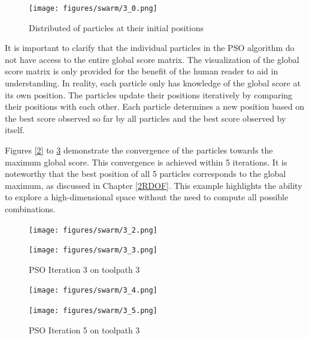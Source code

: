 \begin{figure}[H]
	\centerline{\texttt{[image: figures/swarm/3\_0.png]}}
	\caption{Distributed of particles at their initial positions}
	\label{PSO_1}
\end{figure}



It is important to clarify that the individual particles in the \acrshort{PSO} algorithm do not have access to the entire global score matrix. The visualization of the global score matrix is only provided for the benefit of the human reader to aid in understanding. In reality, each particle only has knowledge of the global score at its own position. The particles update their positions iteratively by comparing their positions with each other. Each particle determines a new position based on the best score observed so far by all particles and the best score observed by itself. 

Figures \ref{2} to \ref{5} demonstrate the convergence of the particles towards the maximum global score. This convergence is achieved within 5 iterations. It is noteworthy that the best position of all 5 particles corresponds to the global maximum, as discussed in Chapter \ref{2RDOF}. This example highlights the ability to explore a high-dimensional space without the need to compute all possible combinations.


\begin{figure}[H]
	\centering
	\begin{minipage}{0.5\textwidth}
		\texttt{[image: figures/swarm/3\_2.png]}
		\caption{PSO Iteration 2 on toolpath 3}
		\label{2}
	\end{minipage}\hfill
	\begin{minipage}{0.5\textwidth}
		\texttt{[image: figures/swarm/3\_3.png]}
		\caption{PSO Iteration 3 on toolpath 3}
		\label{3}
	\end{minipage}\par
\end{figure}	


\begin{figure}[H]	
		\centering
	\begin{minipage}{0.5\textwidth}
		\texttt{[image: figures/swarm/3\_4.png]}
		\caption{PSO Iteration 4 on toolpath 3}
		\label{4}
	\end{minipage}\hfill
	\begin{minipage}{0.5\textwidth}
		\texttt{[image: figures/swarm/3\_5.png]}
		\caption{PSO Iteration 5 on toolpath 3}
		\label{5}
	\end{minipage}\par
\end{figure}

